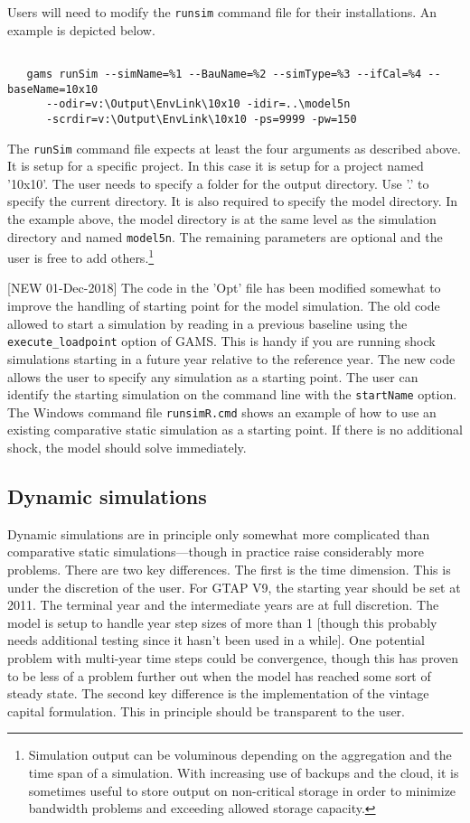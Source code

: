 Users will need to modify the \texttt{runsim} command file for their
installations. An example is depicted below.

\begin{verbatim}

   gams runSim --simName=%1 --BauName=%2 --simType=%3 --ifCal=%4 --baseName=10x10
      --odir=v:\Output\EnvLink\10x10 -idir=..\model5n
      -scrdir=v:\Output\EnvLink\10x10 -ps=9999 -pw=150

\end{verbatim}

\noindent The \texttt{runSim} command file expects at least the four arguments as described
above. It is setup for a specific project. In this case it is setup for a
project named '10x10'. The user needs to specify a folder for the output
directory. Use '.' to specify the current directory. It is also required to
specify the model directory. In the example above, the model directory is at the
same level as the simulation directory and named \texttt{model5n}. The remaining
parameters are optional and the user is free to add others.\footnote{Simulation
output can be voluminous depending on the aggregation and the time span of a
simulation. With increasing use of backups and the cloud, it is sometimes useful
to store output on non-critical storage in order to minimize bandwidth problems
and exceeding allowed storage capacity.}

[NEW 01-Dec-2018] The code in the 'Opt' file has been modified somewhat to improve
the handling of starting point for the model simulation. The old code allowed to
start a simulation by reading in a previous baseline using the
\texttt{execute\_loadpoint} option of GAMS. This is handy if you are running shock
simulations starting in a future year relative to the reference year. The new
code allows the user to specify any simulation as a starting point. The
user can identify the starting simulation on the command line with the
\texttt{startName} option. The Windows command file \texttt{runsimR.cmd} shows
an example of how to use an existing comparative static simulation as a starting
point. If there is no additional shock, the model should solve immediately.

\subsection{Dynamic simulations}

Dynamic simulations are in principle only somewhat more complicated than
comparative static simulations---though in practice raise considerably more
problems. There are two key differences. The first is the time dimension. This
is under the discretion of the user. For GTAP V9, the starting year should be
set at 2011. The terminal year and the intermediate years are at full
discretion. The model is setup to handle year step sizes of more than 1 [though
this probably needs additional testing since it hasn't been used in a while].
One potential problem with multi-year time steps could be convergence, though
this has proven to be less of a problem further out when the model has reached
some sort of steady state. The second key difference is the implementation of
the vintage capital formulation. This in principle should be transparent to the
user.

